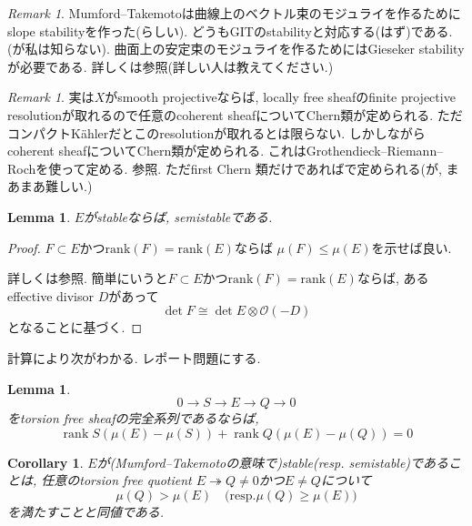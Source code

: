 \documentclass[dvipdfmx,a4paper,11pt]{article} %
\newtheorem{cor}[thm]{Corollary}
\newtheorem{lem}[thm]{Lemma}
\theoremstyle{definition}
\theoremstyle{remark}
\newtheorem{rem}[thm]{Remark}
\numberwithin{equation}{section}
\begin{document}
\begin{rem}
Mumford--Takemotoは曲線上のベクトル束のモジュライを作るためにslope stabilityを作った(らしい). 
どうもGITのstabilityと対応する(はず)である.(が私は知らない).
曲面上の安定束のモジュライを作るためにはGieseker stabilityが必要である. 詳しくは\cite{HL10}参照(詳しい人は教えてください.)
\end{rem}
\begin{rem}
実は$X$がsmooth projectiveならば, locally free sheafのfinite projective resolutionが取れるので任意のcoherent sheafについてChern類が定められる. 
ただコンパクトKählerだとこのresolutionが取れるとは限らない. 
しかしながらcoherent sheafについてChern類が定められる. これはGrothendieck--Riemann--Rochを使って定める. \cite{Gri10}参照. 
ただfirst Chern 類だけであれば\cite[Chapter 5]{Kob14}で定められる(が, まあまあ難しい.)
\end{rem}
\begin{lem}
$E$がstableならば, semistableである. 
\end{lem}
\begin{proof}
$F\subset E$かつ$\mathrm{rank}(F) = \mathrm{rank}(E)$ならば
$\mu(F) \le \mu(E)$を示せば良い. 

詳しくは\cite[2章]{Lazicnote}参照.
簡単にいうと$F\subset E$かつ$\mathrm{rank}(F) = \mathrm{rank}(E)$ならば, あるeffective divisor $D$があって
$$\det F \cong \det E \otimes \mathcal{O}(-D)$$
となることに基づく. 
\end{proof}




計算により次がわかる. レポート問題にする. 
\begin{lem}
\[
0\longrightarrow S\longrightarrow E\longrightarrow Q\longrightarrow 0
\]
をtorsion free sheafの完全系列であるならば,
\[
\operatorname{rank} S (\mu(E)-\mu(S))+\operatorname{rank} Q(\mu(E)-\mu(Q))=0
\]
\end{lem}
\begin{cor}
\label{cor-stable-equiv}
$E$が(Mumford--Takemotoの意味で)stable(resp. semistable)であることは, 
任意のtorsion free quotient $E \twoheadrightarrow Q\neq0$かつ$E \neq Q$について
$$
\mu(Q) >\mu(E)
\quad\text{(resp.
$\mu(Q) \ge \mu(E)$
)}
$$
を満たすことと同値である. 
\end{cor}
\end{document}
